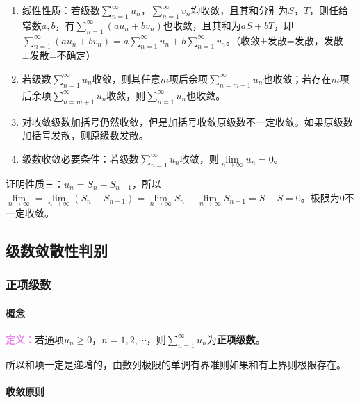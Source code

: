 \documentclass[UTF8, 12pt]{ctexart}
\begin{document}
        \begin{enumerate}
            \item 线性性质：若级数$\sum\limits_{n=1}^\infty u_n$，$\sum\limits_{n=1}^\infty v_n$均收敛，且其和分别为$S$，$T$，则任给常数$a,b$，有$\sum\limits_{n=1}^\infty(au_n+bv_n)$也收敛，且其和为$aS+bT$，即$\sum\limits_{n=1}^\infty(au_n+bv_n)=a\sum\limits_{n=1}^\infty u_n+b\sum\limits_{n=1}^\infty v_n$。（收敛±发散=发散，发散±发散=不确定）
            \item 若级数$\sum\limits_{n=1}^\infty u_n$收敛，则其任意$m$项后余项$\sum\limits_{n=m+1}^\infty u_n$也收敛；若存在$m$项后余项$\sum\limits_{n=m+1}^\infty u_n$收敛，则$\sum\limits_{n=1}^\infty u_n$也收敛。
            \item 对收敛级数加括号仍然收敛，但是加括号收敛原级数不一定收敛。如果原级数加括号发散，则原级数发散。
            \item 级数收敛必要条件：若级数$\sum\limits_{n=1}^\infty u_n$收敛，则$\lim\limits_{n\to\infty}u_n=0$。
        \end{enumerate}

        证明性质三：$u_n=S_n-S_{n-1}$，所以$\lim\limits_{n\to\infty}=\lim\limits_{n\to\infty}(S_n-S_{n-1})=\lim\limits_{n\to\infty}S_n-\lim\limits_{n\to\infty}S_{n-1}=S-S=0$。极限为0不一定收敛。

        \subsection{级数敛散性判别}

        \subsubsection{正项级数}

        \paragraph{概念} \leavevmode \medskip

        \textcolor{violet}{\textbf{定义：}}若通项$u_n\geqslant0$，$n=1,2,\cdots$，则$\sum\limits_{n=1}^\infty u_n$为\textbf{正项级数}。

        所以和项一定是递增的，由数列极限的单调有界准则如果和有上界则极限存在。

        \paragraph{收敛原则} \leavevmode \medskip
\end{document}
